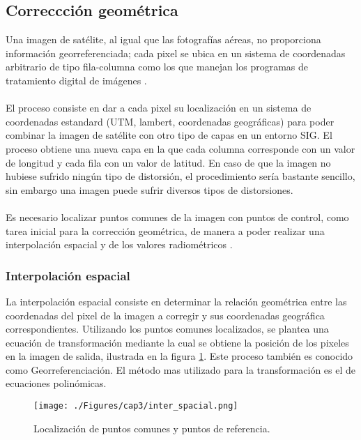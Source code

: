 \subsection{Correccci\'on geom\'etrica}\label{sec:corrGeometrica}
Una imagen de sat\'elite, al igual que las fotograf\'ias a\'ereas, no proporciona informaci\'on georreferenciada; cada pixel se ubica en un sistema de coordenadas arbitrario de tipo fila-columna como los que manejan los programas de tratamiento digital de im\'agenes \cite{deniseCultivos}.\\~\\
El proceso consiste en dar a cada pixel su localizaci\'on en un sistema de coordenadas estandard (UTM, lambert, coordenadas geogr\'aficas) para poder combinar la imagen de sat\'elite con otro tipo de capas en un entorno SIG. El proceso obtiene una nueva capa en la que cada columna corresponde con un valor de longitud y cada fila con un valor de latitud. En caso de que la imagen no hubiese sufrido ningún tipo de distorsi\'on, el procedimiento ser\'ia bastante sencillo, sin embargo una imagen puede sufrir diversos tipos de distorsiones.\\~\\
Es necesario localizar puntos comunes de la imagen con puntos de control, como tarea inicial para la correcci\'on geom\'etrica, de manera a poder realizar una interpolaci\'on espacial y de los valores radiom\'etricos \cite{deniseCultivos}.

\subsubsection{Interpolaci\'on espacial}
La interpolaci\'on espacial consiste en determinar la relaci\'on geom\'etrica entre las coordenadas del pixel de la imagen a corregir y sus coordenadas geogr\'afica correspondientes. Utilizando los puntos comunes localizados, se plantea una ecuaci\'on de transformaci\'on mediante la cual se obtiene la posici\'on de los pixeles en la imagen de salida, ilustrada en la figura \ref{fig:intEspacial}. Este proceso tambi\'en es conocido como Georreferenciaci\'on. El m\'etodo mas utilizado para la transformaci\'on es el de ecuaciones polin\'omicas. 
    \begin{figure}[H]
    	\centering
    	\texttt{[image: ./Figures/cap3/inter\_spacial.png]}
    	\caption{Localizaci\'on de puntos comunes y puntos de referencia.}
    	\label{fig:intEspacial}
    \end{figure}
 
